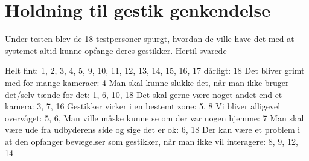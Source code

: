 \section{Holdning til gestik genkendelse}
\label{TestresultaterOvervaagning}
%
Under testen blev de 18 testpersoner spurgt, hvordan de ville have det med at systemet altid kunne opfange deres gestikker. Hertil svarede

Helt fint: 1, 2, 3, 4, 5, 9, 10, 11, 12, 13, 14, 15, 16, 17
dårligt: 18
Det bliver grimt med for mange kameraer: 4
Man skal kunne slukke det, når man ikke bruger det/selv tænde for det: 1, 6, 10, 18
Det skal gerne være noget andet end et kamera: 3, 7, 16
Gestikker virker i en bestemt zone: 5, 8
Vi bliver alligevel overvåget: 5, 6, 
Man ville måske kunne se om der var nogen hjemme: 7
Man skal være ude fra udbyderens side og sige det er ok: 6, 18
Der kan være et problem i at den opfanger bevægelser som gestikker, når man ikke vil interagere: 8, 9, 12, 14


